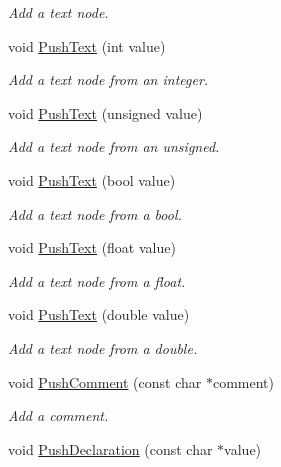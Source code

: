 \begin{DoxyCompactItemize}
\begin{DoxyCompactList}\small\item\em Add a text node. \end{DoxyCompactList}\item 
void \hyperlink{classtinyxml2_1_1_x_m_l_printer_a3e0d4d78de25d4cf081009e1431cea7e}{Push\-Text} (int value)
\begin{DoxyCompactList}\small\item\em Add a text node from an integer. \end{DoxyCompactList}\item 
void \hyperlink{classtinyxml2_1_1_x_m_l_printer_a661fb50e7e0a4918d2d259cb0fae647e}{Push\-Text} (unsigned value)
\begin{DoxyCompactList}\small\item\em Add a text node from an unsigned. \end{DoxyCompactList}\item 
void \hyperlink{classtinyxml2_1_1_x_m_l_printer_a4390e5fa1ed05189a8686647345ab29f}{Push\-Text} (bool value)
\begin{DoxyCompactList}\small\item\em Add a text node from a bool. \end{DoxyCompactList}\item 
void \hyperlink{classtinyxml2_1_1_x_m_l_printer_a1dbb1390e829d0673af66b9cd1928bd7}{Push\-Text} (float value)
\begin{DoxyCompactList}\small\item\em Add a text node from a float. \end{DoxyCompactList}\item 
void \hyperlink{classtinyxml2_1_1_x_m_l_printer_aa715302dfc09473c77c853cbd5431965}{Push\-Text} (double value)
\begin{DoxyCompactList}\small\item\em Add a text node from a double. \end{DoxyCompactList}\item 
void \hyperlink{classtinyxml2_1_1_x_m_l_printer_afc8416814219591c2fd5656e0c233140}{Push\-Comment} (const char $\ast$comment)
\begin{DoxyCompactList}\small\item\em Add a comment. \end{DoxyCompactList}\item 
void \hyperlink{classtinyxml2_1_1_x_m_l_printer_a2fe3565e262594efc6c0276723c83fe7}{Push\-Declaration} (const char $\ast$value)
\item 

\end{DoxyCompactItemize}
